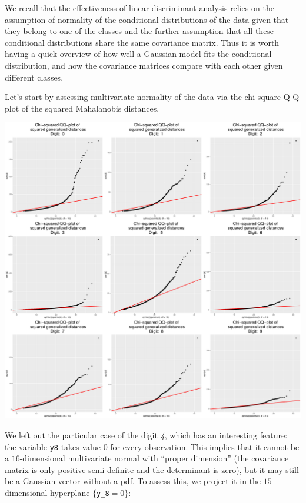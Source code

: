 \documentclass[
  letterpaper,
  DIV=11,
  numbers=noendperiod]{scrartcl}
\begin{document}
We recall that the effectiveness of linear discriminant analysis relies
on the assumption of normality of the conditional distributions of the
data given that they belong to one of the classes and the further
assumption that all these conditional distributions share the same
covariance matrix. Thus it is worth having a quick overview of how well
a Gaussian model fits the conditional distribution, and how the
covariance matrices compare with each other given different classes.

Let's start by assessing multivariate normality of the data via the
chi-square Q-Q plot of the squared Mahalanobis distances.

\includegraphics{ProblemSet2_files/figure-pdf/unnamed-chunk-62-1.pdf}

We left out the particular case of the digit \emph{4}, which has an
interesting feature: the variable \texttt{y8} takes value \(0\) for
every observation. This implies that it cannot be a \(16\)-dimensional
multivariate normal with ``proper dimension'' (the covariance matrix is
only positive semi-definite and the determinant is zero), but it may
still be a Gaussian vector without a pdf. To assess this, we project it
in the \(15\)-dimensional hyperplane \(\{\)\texttt{y\_8}\(=0\}\):
\end{document}
